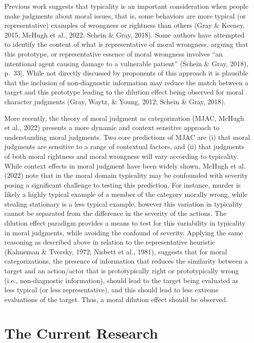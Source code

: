 \documentclass[
  man,floatsintext]{apa6}
\begin{document}
Previous work suggests that typicality is an important consideration when people make judgments about moral issues, that is, some behaviors are more typical (or representative) examples of wrongness or rightness than others (Gray \& Keeney, 2015; McHugh et al., 2022; Schein \& Gray, 2018). Some authors have attempted to identify the content of what is representative of moral wrongness, arguing that this prototype, or representative essence of moral wrongness involves ``an intentional agent causing damage to a vulnerable patient'' (Schein \& Gray, 2018), p.~33{]}. While not directly discussed by proponents of this approach it is plausible that the inclusion of non-diagnostic information may reduce the match between a target and this prototype leading to the dilution effect being observed for moral character judgments (Gray, Waytz, \& Young, 2012; Schein \& Gray, 2018).

More recently, the theory of moral judgment as categorization (MJAC, McHugh et al., 2022) presents a more dynamic and context sensitive approach to understanding moral judgments. Two core predictions of MJAC are (i) that moral judgments are sensitive to a range of contextual factors, and (ii) that judgments of both moral rightness and moral wrongness will vary according to typicality. While context effects in moral judgment have been widely shown, McHugh et al. (2022) note that in the moral domain typicality may be confounded with severity posing a significant challenge to testing this prediction. For instance, murder is likely a highly typical example of a member of the category morally wrong, while stealing stationary is a less typical example, however this variation in typicality cannot be separated from the difference in the severity of the actions. The dilution effect paradigm provides a means to test for this variability in typicality in moral judgments, while avoiding the confound of severity. Applying the same reasoning as described above in relation to the representative heuristic (Kahneman \& Tversky, 1972; Nisbett et al., 1981), suggests that for moral categorizations, the presence of information that reduces the similarity between a target and an action/actor that is prototypically right or prototypically wrong (i.e., non-diagnostic information), should lead to the target being evaluated as less typical (or less representative), and this should lead to less extreme evaluations of the target. Thus, a moral dilution effect should be observed.

\section{The Current Research}\label{the-current-research}
\end{document}
